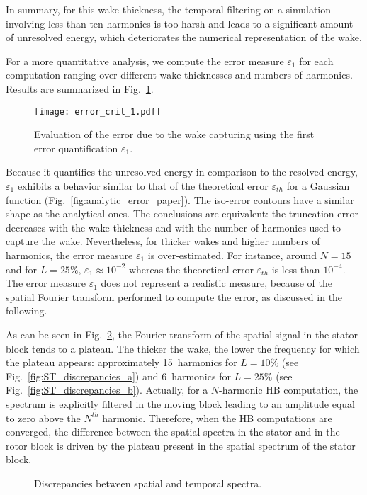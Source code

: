 In summary, for this wake thickness, the temporal filtering 
on a simulation involving less than ten harmonics is too harsh and leads 
to a significant amount of unresolved energy, 
which deteriorates the numerical representation
of the wake.

For a more quantitative analysis, we compute the error measure
$\varepsilon_1$ for each computation ranging over different 
wake thicknesses and numbers of harmonics. 
Results are summarized in Fig.~\ref{fig:crit_1_3d}.
\begin{figure}[htp]
    \centering\texttt{[image: error\_crit\_1.pdf]}
  \caption{Evaluation of the error due to the wake 
  capturing using the first error quantification $\varepsilon_1$.}
  \label{fig:crit_1_3d}
\end{figure}
Because it quantifies the unresolved energy in 
comparison to the resolved energy, $\varepsilon_1$ 
exhibits a behavior similar to that of 
the theoretical error $\varepsilon_{th}$ for a Gaussian function 
(Fig.~\ref{fig:analytic_error_paper}).
The iso-error contours have a similar shape 
as the analytical ones. 
The conclusions are equivalent: the truncation error decreases with 
the wake thickness and with the number of harmonics used to capture the wake.
Nevertheless, for thicker wakes and higher numbers of harmonics, 
the error measure $\varepsilon_1$ is over-estimated. 
For instance, around $N=15$ and for $L=25\%$,
$\varepsilon_1 \approx 10^{-2}$ whereas the theoretical error $\varepsilon_{th}$
is less than $10^{-4}$. The error 
measure $\varepsilon_1$ does not represent a 
realistic measure, because of the spatial 
Fourier transform performed to compute 
the error, as discussed in the following.

As can be seen in Fig.~\ref{fig:ST_discrepancies}, 
the Fourier transform of the spatial signal in the stator block tends to a plateau. 
The thicker the wake, 
the lower the frequency for which the plateau appears: 
approximately 15~harmonics for $L=10\%$
(see Fig.~\ref{fig:ST_discrepancies_a}) and 
6~harmonics for $L=25\%$ (see Fig.~\ref{fig:ST_discrepancies_b}).
Actually, for a $N$-harmonic HB computation, the spectrum is 
explicitly filtered in the moving block leading to an amplitude 
equal to zero above the $N^{th}$ harmonic. 
Therefore, when the HB computations are converged, the difference between the spatial 
spectra in the stator and in the rotor block is driven by the plateau present 
in the spatial spectrum of the stator block.
\begin{figure}[htp]
  \begin{center}
  \end{center}
  \caption{Discrepancies between spatial and temporal spectra.}
  \label{fig:ST_discrepancies}
\end{figure}

